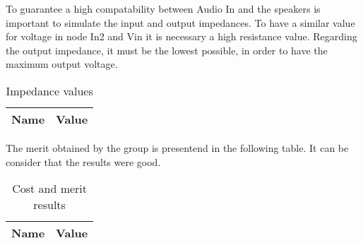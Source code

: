 \par To guarantee a high compatability between Audio In and the speakers is important to simulate the input and output impedances. To have a similar value for voltage in node In2 and Vin it is necessary a high resistance value. Regarding the output impedance, it must be the lowest possible, in order to have the maximum output voltage.

\begin{table}[!ht]
  \centering
  \begin{tabular}{|l|r|}
    \hline    
    {\bf Name} & {\bf Value} \\ \hline
    
  \end{tabular}
  \caption{Impedance values}
  \label{tab:ng5}
\end{table}

\par The merit obtained by the group is presentend in the following table. It can be consider that the results were good.

\begin{table}[!ht]
  \centering
  \begin{tabular}{|l|r|}
    \hline    
    {\bf Name} & {\bf Value } \\ \hline
    
  \end{tabular}
  \caption{Cost and merit results}
  \label{tab:ngs1}
\end{table}


